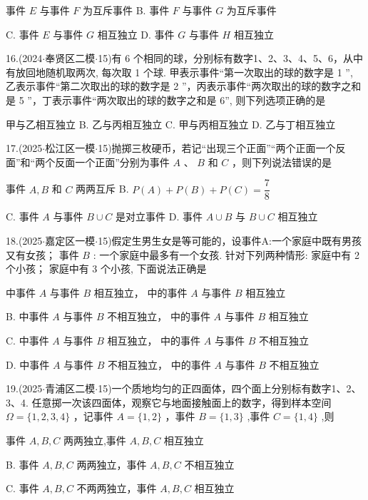 \xx{}{}{}{}事件 $E$ 与事件 $F$ 为互斥事件 B. 事件 $F$ 与事件 $G$ 为互斥事件

C. 事件 $E$ 与事件 $G$ 相互独立 D. 事件 $G$ 与事件 $H$ 相互独立

16.(2024$\cdot$奉贤区二模$\cdot$15)有 6 个相同的球，分别标有数字1、2、3、4、5、6，从中有放回地随机取两次, 每次取 1 个球. 甲表示事件“第一次取出的球的数字是 1 ”, 乙表示事件“第二次取出的球的数字是 2 ”，丙表示事件“两次取出的球的数字之和是 5 ”，丁表示事件“两次取出的球的数字之和是 6”, 则下列选项正确的是 \dotfill{(\kh{})}

\xx{}{}{}{}甲与乙相互独立 B. 乙与丙相互独立 C. 甲与丙相互独立 D. 乙与丁相互独立

17.(2025$\cdot$松江区一模$\cdot$15)抛掷三枚硬币，若记“出现三个正面”“两个正面一个反面”和“两个反面一个正面”分别为事件 $A$ 、 $B$ 和 $C$ ，则下列说法错误的是 \dotfill{(\kh{})}

\xx{}{}{}{}事件 $A,B$ 和 $C$ 两两互斥 B. $P\left( A\right)  + P\left( B\right)  + P\left( C\right)  = \dfrac{7}{8}$

C. 事件 $A$ 与事件 $B \cup  C$ 是对立事件 D. 事件 $A \cup  B$ 与 $B \cup  C$ 相互独立

18.(2025$\cdot$嘉定区一模$\cdot$15)假定生男生女是等可能的，设事件A:一个家庭中既有男孩又有女孩； 事件 $B$ : 一个家庭中最多有一个女孩. 针对下列两种情形:   家庭中有 2 个小孩；   家庭中有 3 个小孩, 下面说法正确是 \dotfill{(\kh{})}

\xx{}{}{}{}  中事件 $A$ 与事件 $B$ 相互独立，  中的事件 $A$ 与事件 $B$ 相互独立

B.   中事件 $A$ 与事件 $B$ 不相互独立，  中的事件 $A$ 与事件 $B$ 相互独立

C.   中事件 $A$ 与事件 $B$ 相互独立，  中的事件 $A$ 与事件 $B$ 不相互独立

D.   中事件 $A$ 与事件 $B$ 不相互独立，  中的事件 $A$ 与事件 $B$ 不相互独立

19.(2025$\cdot$青浦区二模$\cdot$15)一个质地均匀的正四面体，四个面上分别标有数字1、2、3、4. 任意掷一次该四面体，观察它与地面接触面上的数字，得到样本空间 $\Omega  = \{ 1,2,3,4\}$ ，记事件 $A = \{ 1,2\}$ ，事件 $B = \{ 1,3\}$ ,事件 $C = \{ 1,4\}$ ,则 \dotfill{(\kh{})}

\xx{}{}{}{}事件 $A,B,C$ 两两独立,事件 $A,B,C$ 相互独立

B. 事件 $A,B,C$ 两两独立，事件 $A,B,C$ 不相互独立

C. 事件 $A,B,C$ 不两两独立，事件 $A,B,C$ 相互独立

